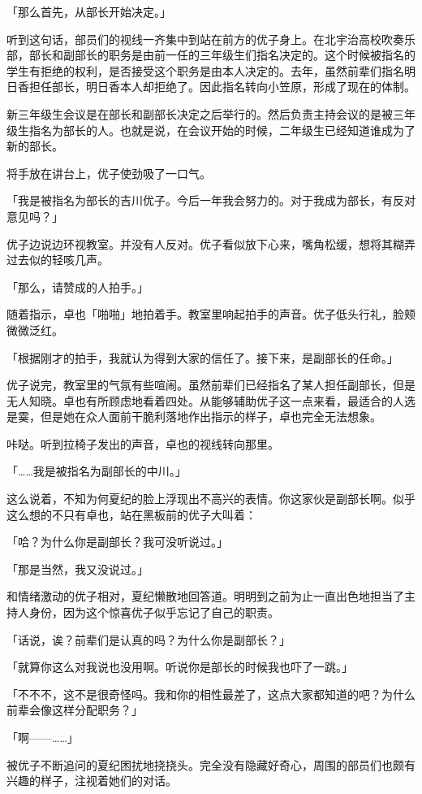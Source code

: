 \documentclass[UTF8]{ctexart}
\begin{document}
    「那么首先，从部长开始决定。」

    听到这句话，部员们的视线一齐集中到站在前方的优子身上。在北宇治高校吹奏乐部，部长和副部长的职务是由前一任的三年级生们指名决定的。这个时候被指名的学生有拒绝的权利，是否接受这个职务是由本人决定的。去年，虽然前辈们指名明日香担任部长，明日香本人却拒绝了。因此指名转向小笠原，形成了现在的体制。

    新三年级生会议是在部长和副部长决定之后举行的。然后负责主持会议的是被三年级生指名为部长的人。也就是说，在会议开始的时候，二年级生已经知道谁成为了新的部长。

    将手放在讲台上，优子使劲吸了一口气。

    「我是被指名为部长的吉川优子。今后一年我会努力的。对于我成为部长，有反对意见吗？」

    优子边说边环视教室。并没有人反对。优子看似放下心来，嘴角松缓，想将其糊弄过去似的轻咳几声。

    「那么，请赞成的人拍手。」

    随着指示，卓也「啪啪」地拍着手。教室里响起拍手的声音。优子低头行礼，脸颊微微泛红。

    「根据刚才的拍手，我就认为得到大家的信任了。接下来，是副部长的任命。」

    优子说完，教室里的气氛有些喧闹。虽然前辈们已经指名了某人担任副部长，但是无人知晓。卓也有所顾虑地看着四处。从能够辅助优子这一点来看，最适合的人选是霙，但是她在众人面前干脆利落地作出指示的样子，卓也完全无法想象。

    咔哒。听到拉椅子发出的声音，卓也的视线转向那里。

    「……我是被指名为副部长的中川。」

    这么说着，不知为何夏纪的脸上浮现出不高兴的表情。你这家伙是副部长啊。似乎这么想的不只有卓也，站在黑板前的优子大叫着：

    「哈？为什么你是副部长？我可没听说过。」

    「那是当然，我又没说过。」

    和情绪激动的优子相对，夏纪懒散地回答道。明明到之前为止一直出色地担当了主持人身份，因为这个惊喜优子似乎忘记了自己的职责。

    「话说，诶？前辈们是认真的吗？为什么你是副部长？」

    「就算你这么对我说也没用啊。听说你是部长的时候我也吓了一跳。」

    「不不不，这不是很奇怪吗。我和你的相性最差了，这点大家都知道的吧？为什么前辈会像这样分配职务？」

    「啊——……」

    被优子不断追问的夏纪困扰地挠挠头。完全没有隐藏好奇心，周围的部员们也颇有兴趣的样子，注视着她们的对话。
\end{document}
